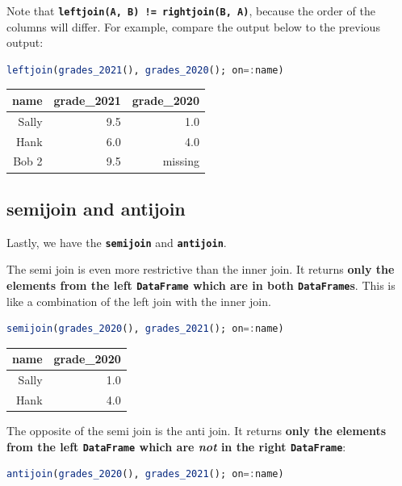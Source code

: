 \documentclass[
  notoc %
]{tufte-book}
\newcommand{\passthrough}[1]{#1}
\begin{document}
Note that
\textbf{\passthrough{\lstinline"leftjoin(A, B) != rightjoin(B, A)"}},
because the order of the columns will differ. For example, compare the
output below to the previous output:

\begin{lstlisting}[language=Julia]
leftjoin(grades_2021(), grades_2020(); on=:name)
\end{lstlisting}

\begin{longtable}[]{@{}rrr@{}}
\toprule()
name & grade\_2021 & grade\_2020 \\
\midrule()
\endhead
Sally & 9.5 & 1.0 \\
Hank & 6.0 & 4.0 \\
Bob 2 & 9.5 & missing \\
\bottomrule()
\end{longtable}

\hypertarget{sec:semijoin_antijoin}{%
\subsection{semijoin and antijoin}\label{sec:semijoin_antijoin}}

Lastly, we have the \textbf{\passthrough{\lstinline!semijoin!}} and
\textbf{\passthrough{\lstinline!antijoin!}}.

The semi join is even more restrictive than the inner join. It returns
\textbf{only the elements from the left
\passthrough{\lstinline!DataFrame!} which are in both
\passthrough{\lstinline!DataFrame!}s}. This is like a combination of the
left join with the inner join.

\begin{lstlisting}[language=Julia]
semijoin(grades_2020(), grades_2021(); on=:name)
\end{lstlisting}

\begin{longtable}[]{@{}rr@{}}
\toprule()
name & grade\_2020 \\
\midrule()
\endhead
Sally & 1.0 \\
Hank & 4.0 \\
\bottomrule()
\end{longtable}

The opposite of the semi join is the anti join. It returns \textbf{only
the elements from the left \passthrough{\lstinline!DataFrame!} which are
\emph{not} in the right \passthrough{\lstinline!DataFrame!}}:

\begin{lstlisting}[language=Julia]
antijoin(grades_2020(), grades_2021(); on=:name)
\end{lstlisting}
\end{document}
